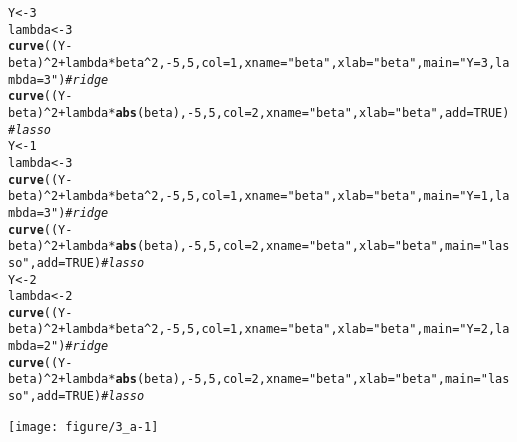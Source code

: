 \documentclass[12pt]{article}\usepackage[]{graphicx}\usepackage[]{color}
\makeatletter
\def\maxwidth{ %
  \ifdim\Gin@nat@width>\linewidth
    \linewidth
  \else
    \Gin@nat@width
  \fi
}
\newcommand{\hlnum}[1]{\textcolor[rgb]{0.686,0.059,0.569}{#1}}%
\newcommand{\hlstr}[1]{\textcolor[rgb]{0.192,0.494,0.8}{#1}}%
\newcommand{\hlcom}[1]{\textcolor[rgb]{0.678,0.584,0.686}{\textit{#1}}}%
\newcommand{\hlopt}[1]{\textcolor[rgb]{0,0,0}{#1}}%
\newcommand{\hlstd}[1]{\textcolor[rgb]{0.345,0.345,0.345}{#1}}%
\newcommand{\hlkwb}[1]{\textcolor[rgb]{0.69,0.353,0.396}{#1}}%
\newcommand{\hlkwc}[1]{\textcolor[rgb]{0.333,0.667,0.333}{#1}}%
\newcommand{\hlkwd}[1]{\textcolor[rgb]{0.737,0.353,0.396}{\textbf{#1}}}%
\newenvironment{kframe}{%
 \def\at@end@of@kframe{}%
 \ifinner\ifhmode%
  \def\at@end@of@kframe{\end{minipage}}%
  \begin{minipage}{\columnwidth}%
 \fi\fi%
 \def\FrameCommand##1{\hskip\@totalleftmargin \hskip-\fboxsep
 \colorbox{shadecolor}{##1}\hskip-\fboxsep
     \hskip-\linewidth \hskip-\@totalleftmargin \hskip\columnwidth}%
 \MakeFramed {\advance\hsize-\width
   \@totalleftmargin\z@ \linewidth\hsize
   \@setminipage}}%
 {\par\unskip\endMakeFramed%
 \at@end@of@kframe}
\newenvironment{knitrout}{}{} %
\theoremstyle{definition}
\makeatother
\begin{document}
\begin{enumerate}[1.]
\begin{enumerate}[(a)]
\begin{knitrout}
\begin{kframe}
\begin{alltt}
\hlstd{Y} \hlkwb{<-} \hlnum{3}
\hlstd{lambda} \hlkwb{<-} \hlnum{3}
\hlkwd{curve}\hlstd{((Y} \hlopt{-} \hlstd{beta)}\hlopt{^}\hlnum{2} \hlopt{+} \hlstd{lambda}\hlopt{*}\hlstd{beta}\hlopt{^}\hlnum{2}\hlstd{,} \hlopt{-}\hlnum{5}\hlstd{,} \hlnum{5}\hlstd{,} \hlkwc{col} \hlstd{=}\hlnum{1}\hlstd{,}\hlkwc{xname} \hlstd{=} \hlstr{"beta"}\hlstd{,} \hlkwc{xlab}\hlstd{=}\hlstr{"beta"}\hlstd{,} \hlkwc{main}\hlstd{=}\hlstr{"Y=3, lambda=3"}\hlstd{)} \hlcom{# ridge}
\hlkwd{curve}\hlstd{((Y} \hlopt{-} \hlstd{beta)}\hlopt{^}\hlnum{2} \hlopt{+} \hlstd{lambda}\hlopt{*}\hlkwd{abs}\hlstd{(beta),} \hlopt{-}\hlnum{5}\hlstd{,} \hlnum{5}\hlstd{,} \hlkwc{col} \hlstd{=}\hlnum{2}\hlstd{,} \hlkwc{xname} \hlstd{=} \hlstr{"beta"}\hlstd{,} \hlkwc{xlab}\hlstd{=}\hlstr{"beta"}\hlstd{,} \hlkwc{add} \hlstd{=} \hlnum{TRUE}\hlstd{)} \hlcom{# lasso}
\hlstd{Y} \hlkwb{<-} \hlnum{1}
\hlstd{lambda} \hlkwb{<-} \hlnum{3}
\hlkwd{curve}\hlstd{((Y} \hlopt{-} \hlstd{beta)}\hlopt{^}\hlnum{2} \hlopt{+} \hlstd{lambda}\hlopt{*}\hlstd{beta}\hlopt{^}\hlnum{2}\hlstd{,} \hlopt{-}\hlnum{5}\hlstd{,} \hlnum{5}\hlstd{,} \hlkwc{col} \hlstd{=}\hlnum{1}\hlstd{,}\hlkwc{xname} \hlstd{=} \hlstr{"beta"}\hlstd{,} \hlkwc{xlab}\hlstd{=}\hlstr{"beta"}\hlstd{,} \hlkwc{main}\hlstd{=}\hlstr{"Y=1, lambda=3"}\hlstd{)} \hlcom{# ridge}
\hlkwd{curve}\hlstd{((Y} \hlopt{-} \hlstd{beta)}\hlopt{^}\hlnum{2} \hlopt{+} \hlstd{lambda}\hlopt{*}\hlkwd{abs}\hlstd{(beta),} \hlopt{-}\hlnum{5}\hlstd{,} \hlnum{5}\hlstd{,} \hlkwc{col} \hlstd{=}\hlnum{2}\hlstd{,} \hlkwc{xname} \hlstd{=} \hlstr{"beta"}\hlstd{,} \hlkwc{xlab}\hlstd{=}\hlstr{"beta"}\hlstd{,} \hlkwc{main}\hlstd{=}\hlstr{"lasso"}\hlstd{,} \hlkwc{add} \hlstd{=} \hlnum{TRUE}\hlstd{)} \hlcom{# lasso}
\hlstd{Y} \hlkwb{<-} \hlnum{2}
\hlstd{lambda} \hlkwb{<-} \hlnum{2}
\hlkwd{curve}\hlstd{((Y} \hlopt{-} \hlstd{beta)}\hlopt{^}\hlnum{2} \hlopt{+} \hlstd{lambda}\hlopt{*}\hlstd{beta}\hlopt{^}\hlnum{2}\hlstd{,} \hlopt{-}\hlnum{5}\hlstd{,} \hlnum{5}\hlstd{,} \hlkwc{col} \hlstd{=}\hlnum{1}\hlstd{,} \hlkwc{xname} \hlstd{=} \hlstr{"beta"}\hlstd{,} \hlkwc{xlab}\hlstd{=}\hlstr{"beta"}\hlstd{,} \hlkwc{main}\hlstd{=}\hlstr{"Y=2, lambda=2"}\hlstd{)} \hlcom{# ridge}
\hlkwd{curve}\hlstd{((Y} \hlopt{-} \hlstd{beta)}\hlopt{^}\hlnum{2} \hlopt{+} \hlstd{lambda}\hlopt{*}\hlkwd{abs}\hlstd{(beta),} \hlopt{-}\hlnum{5}\hlstd{,} \hlnum{5}\hlstd{,} \hlkwc{col} \hlstd{=}\hlnum{2}\hlstd{,} \hlkwc{xname} \hlstd{=} \hlstr{"beta"}\hlstd{,} \hlkwc{xlab}\hlstd{=}\hlstr{"beta"}\hlstd{,} \hlkwc{main}\hlstd{=}\hlstr{"lasso"}\hlstd{,} \hlkwc{add} \hlstd{=} \hlnum{TRUE}\hlstd{)} \hlcom{# lasso}
\end{alltt}
\end{kframe}
\texttt{[image: figure/3\_a-1]} 


\end{knitrout}
\end{enumerate}
\end{enumerate}
\end{document}
